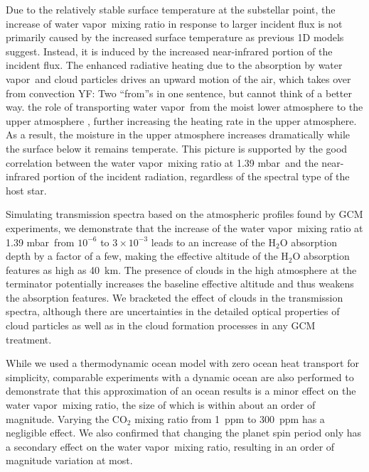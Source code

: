 \documentclass[11pt,numberedappendix,twocolappendix,]{emulateapj}
\def\water{H$_2$O }
\def\preslevel{1.39 mbar\ }
\newcommand{\yf}[1]{{\color{orange}#1}}
\newcommand{\wv}{{\color{orange}water vapor\ }}
\begin{document}
Due to the relatively stable surface temperature at the substellar point, the increase of \wv mixing ratio in response to larger incident flux is not primarily caused by the increased surface temperature as previous 1D models suggest. 
Instead, it is induced by the increased near-infrared portion of the incident flux. 
The enhanced radiative heating due to the absorption by \wv \yf{and cloud particles} drives an upward motion of the air, which takes over from convection \yf{YF: Two ``from''s in one sentence, but cannot think of a better way.} the role of transporting \wv from the moist lower atmosphere to the upper atmosphere , further increasing the heating rate in the upper atmosphere.
As a result, the moisture in the upper atmosphere increases dramatically while the surface below it remains temperate. 
This picture is supported by the good correlation between the \wv mixing ratio at \preslevel and the near-infrared portion of the incident radiation, regardless of the spectral type of the host star. 

Simulating transmission spectra based on the atmospheric profiles found by GCM experiments, 
we demonstrate that the increase of the \wv mixing ratio at \preslevel from $10^{-6}$ to $3 \times 10^{-3}$ leads to an increase of the \water absorption depth by a factor of a few, making the effective altitude of the \water absorption features as high as 40~km. 
The presence of clouds in the high atmosphere at the terminator potentially increases the baseline effective altitude and thus weakens the absorption features. 
We bracketed the effect of clouds in the transmission spectra, 
although there are uncertainties in the detailed optical properties of cloud particles as well as in the cloud formation processes in any GCM treatment. 

While we used a thermodynamic ocean model with zero ocean heat transport for simplicity, comparable experiments with a dynamic ocean are also performed to demonstrate that this approximation of an ocean results is a minor effect on the \wv mixing ratio, the size of which is within about an order of magnitude. 
Varying the CO$_2$ mixing ratio from 1~ppm to 300~ppm has a negligible effect. 
We also confirmed that changing the planet spin period only has a secondary effect on the \wv mixing ratio, resulting in an order of magnitude variation at most. 
\end{document}
